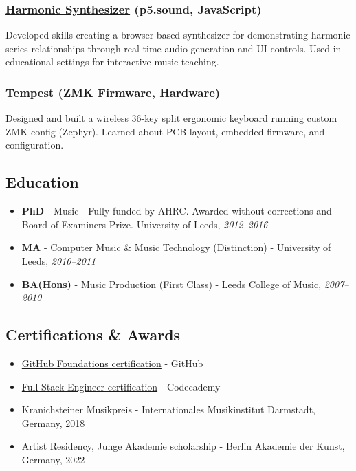 \documentclass[10pt,a4paper]{article}
\providecommand{\tightlist}{%
  \setlength{\itemsep}{0pt}\setlength{\parskip}{0pt}}
\begin{document}
\subsubsection{\texorpdfstring{\href{https://github.com/thrly/harmonic-series-synth}{Harmonic
Synthesizer} (p5.sound,
JavaScript)}{Harmonic Synthesizer (p5.sound, JavaScript)}}\label{harmonic-synthesizer-p5.sound-javascript}

Developed skills creating a browser-based synthesizer for demonstrating
harmonic series relationships through real-time audio generation and UI
controls. Used in educational settings for interactive music teaching.

\subsubsection{\texorpdfstring{\href{https://github.com/thrly/tempest}{Tempest}
(ZMK Firmware,
Hardware)}{Tempest (ZMK Firmware, Hardware)}}\label{tempest-zmk-firmware-hardware}

Designed and built a wireless 36-key split ergonomic keyboard running
custom ZMK config (Zephyr). Learned about PCB layout, embedded firmware,
and configuration.

\subsection{Education}\label{education}

\begin{itemize}
\tightlist
\item
  \textbf{PhD} - Music - Fully funded by AHRC. Awarded without
  corrections and Board of Examiners Prize. University of Leeds,
  \emph{2012--2016}
\item
  \textbf{MA} - Computer Music \& Music Technology (Distinction) -
  University of Leeds, \emph{2010--2011}
\item
  \textbf{BA(Hons)} - Music Production (First Class) - Leeds College of
  Music, \emph{2007--2010}
\end{itemize}

\subsection{Certifications \& Awards}\label{certifications-awards}

\begin{itemize}
\tightlist
\item
  \href{https://www.credly.com/badges/8f2ca183-49d2-426a-8483-cbdb8f4efdbd/public_url}{GitHub
  Foundations certification} - GitHub
\item
  \href{https://www.codecademy.com/profiles/thrly/certificates/ffd0f42cce1a44e9a0108b365047a0a6}{Full-Stack
  Engineer certification} - Codecademy
\item
  Kranichsteiner Musikpreis - Internationales Musikinstitut Darmstadt,
  Germany, 2018
\item
  Artist Residency, Junge Akademie scholarship - Berlin Akademie der
  Kunst, Germany, 2022
\end{itemize}
\end{document}

